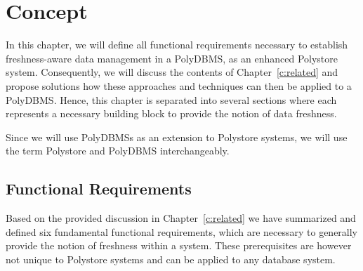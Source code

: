\chapter{Concept}
\label{c:concept}


In this chapter, we will define all functional requirements necessary to establish freshness-aware data management in a PolyDBMS, as an enhanced Polystore system.
Consequently, we will discuss the contents of Chapter~\ref{c:related} and propose solutions how these approaches and techniques can then be applied to a PolyDBMS.
Hence, this chapter is separated into several sections where each represents a necessary building block to provide the notion of data freshness.


Since we will use PolyDBMSs as an extension to Polystore systems, we will use the term Polystore and PolyDBMS interchangeably.

\section{Functional Requirements}

Based on the provided discussion in Chapter~\ref{c:related} we have summarized and defined six fundamental functional
requirements, which are necessary to  generally provide the notion of freshness within a system.
These prerequisites are however not unique to Polystore systems and can be applied to any database system. 

